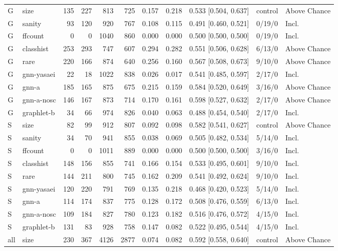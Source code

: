 \begin{tabular}{@{}llrrrrrrrll@{}}
\midrule
G & size & 135 & 227 & 813 & 725 & 0.157 & 0.218 & 0.533 [0.504, 0.637] & control & Above Chance \\
G & sanity & 93 & 120 & 920 & 767 & 0.108 & 0.115 & 0.491 [0.460, 0.521] & 0/19/0 & Incl. \\
G & ffcount & 0 & 0 & 1040 & 860 & 0.000 & 0.000 & 0.500 [0.500, 0.500] & 0/19/0 & Incl. \\
G & classhist & 253 & 293 & 747 & 607 & 0.294 & 0.282 & 0.551 [0.506, 0.628] & 6/13/0 & Above Chance \\
G & rare & 220 & 166 & 874 & 640 & 0.256 & 0.160 & 0.567 [0.508, 0.673] & 9/10/0 & Above Chance \\
G & gnn-yasaei & 22 & 18 & 1022 & 838 & 0.026 & 0.017 & 0.541 [0.485, 0.597] & 2/17/0 & Incl. \\
G & gnn-a & 185 & 165 & 875 & 675 & 0.215 & 0.159 & 0.584 [0.520, 0.649] & 3/16/0 & Above Chance \\
G & gnn-a-nosc & 146 & 167 & 873 & 714 & 0.170 & 0.161 & 0.598 [0.527, 0.632] & 2/17/0 & Above Chance \\
G & graphlet-b & 34 & 66 & 974 & 826 & 0.040 & 0.063 & 0.488 [0.454, 0.540] & 2/17/0 & Incl. \\
\midrule
S & size & 82 & 99 & 912 & 807 & 0.092 & 0.098 & 0.582 [0.541, 0.627] & control & Above Chance \\
S & sanity & 34 & 70 & 941 & 855 & 0.038 & 0.069 & 0.505 [0.482, 0.534] & 5/14/0 & Incl. \\
S & ffcount & 0 & 0 & 1011 & 889 & 0.000 & 0.000 & 0.500 [0.500, 0.500] & 3/16/0 & Incl. \\
S & classhist & 148 & 156 & 855 & 741 & 0.166 & 0.154 & 0.533 [0.495, 0.601] & 9/10/0 & Incl. \\
S & rare & 144 & 211 & 800 & 745 & 0.162 & 0.209 & 0.541 [0.492, 0.624] & 9/10/0 & Incl. \\
S & gnn-yasaei & 120 & 220 & 791 & 769 & 0.135 & 0.218 & 0.468 [0.420, 0.523] & 5/14/0 & Incl. \\
S & gnn-a & 114 & 174 & 837 & 775 & 0.128 & 0.172 & 0.508 [0.476, 0.559] & 6/13/0 & Incl. \\
S & gnn-a-nosc & 109 & 184 & 827 & 780 & 0.123 & 0.182 & 0.516 [0.476, 0.572] & 4/15/0 & Incl. \\
S & graphlet-b & 131 & 83 & 928 & 758 & 0.147 & 0.082 & 0.522 [0.495, 0.544] & 4/15/0 & Incl. \\
\midrule
all & size & 230 & 367 & 4126 & 2877 & 0.074 & 0.082 & 0.592 [0.558, 0.640] & control & Above Chance \\

\end{tabular}
